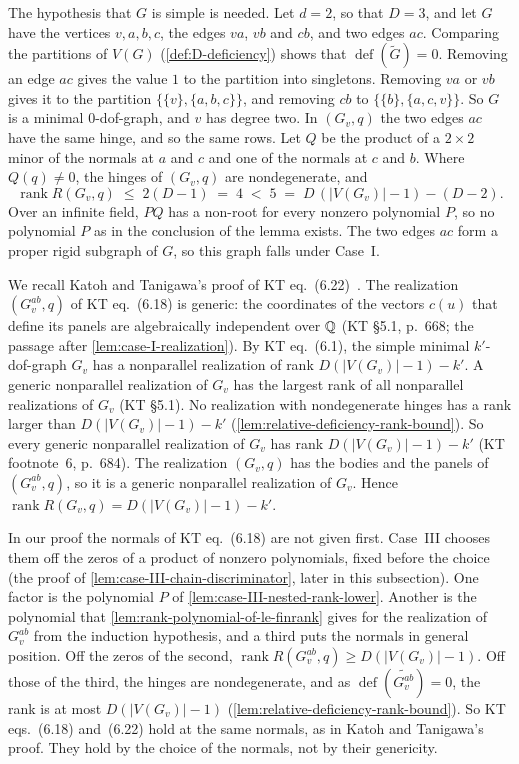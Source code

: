 The hypothesis that $G$ is simple is needed. Let $d = 2$, so that
$D = 3$, and let
$G$ have the vertices $v, a, b, c$, the edges $va$, $vb$ and $cb$, and
two edges $ac$. Comparing the partitions of $V(G)$
(\cref{def:D-deficiency}) shows that $\operatorname{def}(\tilde G) = 0$.
Removing an edge $ac$ gives the value $1$ to the partition into
singletons. Removing $va$ or $vb$ gives it to the partition
$\{\{v\}, \{a, b, c\}\}$, and removing $cb$ to
$\{\{b\}, \{a, c, v\}\}$. So $G$ is a minimal $0$-dof-graph, and $v$ has
degree two. In $(G_v, q)$ the two edges $ac$ have the same hinge, and so
the same rows. Let $Q$ be the product of a $2 \times 2$ minor of the
normals at $a$ and $c$ and one of the normals at $c$ and $b$. Where
$Q(q) \neq 0$, the hinges of $(G_v, q)$ are nondegenerate, and
\[
  \operatorname{rank} R(G_v, q) \;\le\; 2(D - 1) \;=\; 4
  \;<\; 5 \;=\; D\,(|V(G_v)| - 1) - (D - 2).
\]
Over an infinite field, $PQ$ has a non-root for every nonzero
polynomial $P$, so no polynomial $P$ as in the conclusion of the lemma
exists. The two
edges $ac$ form a proper rigid subgraph of $G$, so this graph falls under
Case~I.

\begin{remark}
  We recall Katoh and Tanigawa's proof of KT
  eq.~(6.22)~\cite[pp.~684--685]{katohTanigawa2011}. The realization
  $(G_v^{ab}, q)$ of KT eq.~(6.18) is generic: the coordinates of the
  vectors $c(u)$ that define its panels are algebraically independent
  over ${\mathbb{Q}}$ (KT \S5.1, p.~668; the passage after
  \cref{lem:case-I-realization}). By KT
  eq.~(6.1), the simple minimal $k'$-dof-graph $G_v$ has a nonparallel
  realization of rank $D(|V(G_v)| - 1) - k'$. A generic nonparallel
  realization of $G_v$ has the largest rank of all nonparallel
  realizations of $G_v$ (KT \S5.1). No realization with nondegenerate
  hinges has a rank larger than $D(|V(G_v)| - 1) - k'$
  (\cref{lem:relative-deficiency-rank-bound}). So every
  generic nonparallel realization of $G_v$ has rank
  $D(|V(G_v)| - 1) - k'$ (KT footnote~6, p.~684). The realization
  $(G_v, q)$ has the bodies and the panels of $(G_v^{ab}, q)$, so it is a
  generic nonparallel realization of $G_v$. Hence
  $\operatorname{rank} R(G_v, q) = D(|V(G_v)| - 1) - k'$.

  In our proof the normals of KT eq.~(6.18) are not given first. Case~III
  chooses them off the zeros of a product of nonzero polynomials, fixed
  before the choice (the proof of \cref{lem:case-III-chain-discriminator},
  later in this subsection). One factor is the polynomial $P$ of
  \cref{lem:case-III-nested-rank-lower}. Another is the polynomial that
  \cref{lem:rank-polynomial-of-le-finrank} gives for the realization of
  $G_v^{ab}$ from the induction hypothesis, and a third puts the normals
  in general position. Off the zeros of the second,
  $\operatorname{rank} R(G_v^{ab}, q) \ge D(|V(G_v)| - 1)$. Off those of
  the third, the hinges are nondegenerate, and as
  $\operatorname{def}(\widetilde{G_v^{ab}}) = 0$, the rank is at most
  $D(|V(G_v)| - 1)$ (\cref{lem:relative-deficiency-rank-bound}). So KT
  eqs.~(6.18) and~(6.22) hold at the same normals, as in Katoh and
  Tanigawa's proof. They hold by the choice of the normals, not by their
  genericity.
\end{remark}

